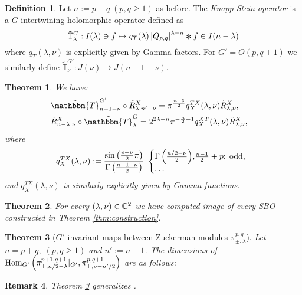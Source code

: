\documentclass[12pt]{article} %
\newcommand{\Conv}{\mathop{\scalebox{1.5}{\raisebox{-0.2ex}{$\ast$}}}}
\newcommand{\assign}{:=}
\newtheorem{theorem}{Theorem}
\newcommand{\Hom}{\mbox{\normalfont Hom}}
\newtheorem{remark}[theorem]{Remark}
\theoremstyle{definition}
\newtheorem{definition}{Definition}
\theoremstyle{exampstyle} \newtheorem{examp}[theorem]{Theorem}
\renewcommand{\Q}{Q_{p,q}}
\newcommand{\todd}{\mbox{\textrm{: odd}}}
\begin{document}
	\begin{definition}
		Let $n:=p+q\;(p,q\ge1)$ as before.
		The {\it Knapp-Stein operator} is a $G$-intertwining holomorphic operator defined as
		\begin{equation*}
		\tilde{\mathbb{T}}_{\lambda}^G:I(\lambda)\ni f\mapsto q_T(\lambda)\myabs{\Q}^{\lambda-n}\Conv f\in I(n-\lambda)
		\end{equation*}
		where $q_T(\lambda,\nu)$ is explicitly given by Gamma factors.
		For $G'=O(p,q+1)$ we similarly define $\tilde{\mathbb{T}}^{G'}_\nu:J(\nu)\to J(n-1-\nu)$.
	\end{definition}
	\begin{theorem}
		
		We have:
\begin{eqnarray}
    & \tilde{\mathbbm{T}}^{G'}_{n-1 - \nu} \circ \tilde{R}^X_{\lambda, n' - \nu} =\pi^{\frac{n - 3}{2}} q^{T X}_X
  (\lambda, \nu) \tilde{R}^X_{\lambda, \nu}, &  \nonumber\\
  & \tilde{R}_{n - \lambda, \nu}^X \circ \tilde{\mathbbm{T}}^G_{\lambda} =2^{2\lambda-n}\pi^{-\frac{n}{2}-1} q^{X T}_X
  (\lambda, \nu) \tilde{R}_{\lambda, \nu}^X, &  \nonumber
  \end{eqnarray}
  where
  \begin{gather*}
  q^{T X}_X (\lambda, \nu) \assign\frac{\sin\left( \frac{p-\nu}{2} \pi\right)}{\Gamma\left( \frac{n-1-\nu}{2} \right)} \ \left\{
	  \begin{array}{@{}l@{}l}
    {\Gamma\left( \frac{n / 2 - \nu}{2} \right)}, & \frac{n - 1}{2}+p\todd,\\
    \dots&
  \end{array} \right.
\end{gather*}
and $q_X^{TX}(\lambda,\nu)$ is similarly explicitly given by Gamma functions.
	\end{theorem}
	\begin{theorem}
		For every $(\lambda,\nu)\in\mathbb{C}^2$ we have computed image of every SBO constructed in Theorem \ref{thm:construction}.
	\end{theorem}
\begin{theorem}[$G'$-invariant maps between Zuckerman modules $\pi_{\pm,\lambda}^{p,q}$]\label{thm:Aq}
	Let $n=p+q,\;(p,q\ge1)$ and $n':=n-1$.
	The dimensions of $\Hom_{G'}\left(\pi_{\pm,{n}/{2}-\lambda}^{p+1,q+1}\kern-0.3em\mid_{G'} ,\pi_{\pm,\nu-{n'}/{2}}^{p,q+1} \right)$
	are as follows:\newline
{}\\\vspace{\baselineskip}
\end{theorem}
\begin{remark}
Theorem \ref{thm:Aq} generalizes \cite[Thms. 12.1 and 1.3]{kobayashi2015symmetry}.
\end{remark}
\nocite{kobayashi2015program}
\small


\end{document}
